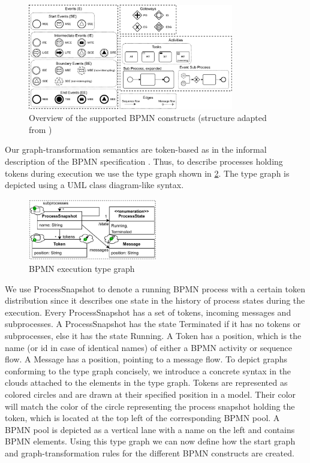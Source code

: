 \documentclass[adraft, copyright, creativecommons]{eptcs} %
\begin{document}
\begin{figure}[h]
    \centering
    \includegraphics[width=0.8\textwidth]{images/bpmn_semantics-feature_overview.pdf}
    \caption{Overview of the supported BPMN constructs (structure adapted from \cite{houhouFirstOrderLogicVerification2022})}
    \label{fig:bpmnConstructsOverview}
\end{figure}

Our graph-transformation semantics are token-based as in the informal description of the BPMN specification \cite{objectmanagementgroupBusinessProcessModel2013}.
Thus, to describe processes holding tokens during execution we use the type graph shown in \cref{fig:typeGraph}.
The type graph is depicted using a UML class diagram-like syntax.

\begin{figure}[h]
    \centering
    \includegraphics[width=0.5\textwidth]{images/bpmn_semantics-typegraph.pdf}
    \caption{BPMN execution type graph}
    \label{fig:typeGraph}
\end{figure}

We use \textsf{ProcessSnapshot} to denote a running BPMN process with a certain token distribution since it describes one state in the history of process states during the execution.
Every \textsf{ProcessSnapshot} has a set of \textsf{tokens}, incoming \textsf{messages} and \textsf{subprocesses}.
A \textsf{ProcessSnapshot} has the state \textsf{Terminated} if it has no \textsf{tokens} or \textsf{subprocesses}, else it has the state \textsf{Running}.
A \textsf{Token} has a \textsf{position}, which is the name (or id in case of identical names) of either a BPMN activity or sequence flow.
A \textsf{Message} has a \textsf{position}, pointing to a message flow.
To depict graphs conforming to the type graph concisely, we introduce a concrete syntax in the clouds attached to the elements in the type graph.
Tokens are represented as colored circles and are drawn at their specified position in a model.
Their color will match the color of the circle representing the process snapshot holding the token, which is located at the top left of the corresponding BPMN pool.
A BPMN pool is depicted as a vertical lane with a name on the left and contains BPMN elements.
Using this type graph we can now define how the start graph and graph-transformation rules for the different BPMN constructs are created.
\end{document}
